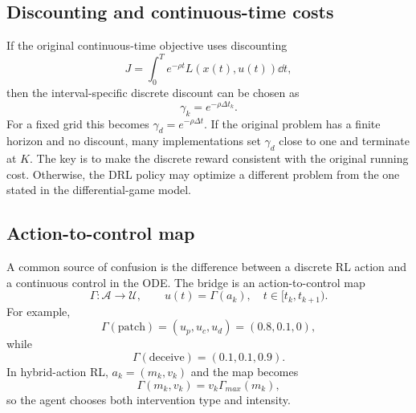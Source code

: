 \documentclass[11pt,a4paper]{article}
\begin{document}
\subsection{Discounting and continuous-time costs}
If the original continuous-time objective uses discounting
\begin{equation}
J=\int_0^T e^{-\rho t}L(x(t),u(t))\dd t,
\end{equation}
then the interval-specific discrete discount can be chosen as
\begin{equation}
\gamma_k=e^{-\rho\Delta t_k}.
\end{equation}
For a fixed grid this becomes $\gamma_d=e^{-\rho\Delta t}$. If the original problem has a finite horizon and no discount, many implementations set $\gamma_d$ close to one and terminate at $K$. The key is to make the discrete reward consistent with the original running cost. Otherwise, the DRL policy may optimize a different problem from the one stated in the differential-game model.

\subsection{Action-to-control map}
A common source of confusion is the difference between a discrete RL action and a continuous control in the ODE. The bridge is an action-to-control map
\begin{equation}
\Gamma:\mathcal{A}\rightarrow\mathcal{U},\qquad u(t)=\Gamma(a_k),\quad t\in[t_k,t_{k+1}).
\end{equation}
For example,
\begin{equation}
\Gamma(\text{patch})=(u_p,u_c,u_d)=(0.8,0.1,0),
\end{equation}
while
\begin{equation}
\Gamma(\text{deceive})=(0.1,0.1,0.9).
\end{equation}
In hybrid-action RL, $a_k=(m_k,v_k)$ and the map becomes
\begin{equation}
\Gamma(m_k,v_k)=v_k\Gamma_{max}(m_k),
\end{equation}
so the agent chooses both intervention type and intensity.
\end{document}

